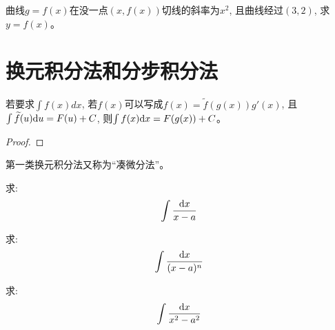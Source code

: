 \begin{example}
    曲线$g=f(x)$在没一点$(x, f(x))$切线的斜率为$x^2$, 且曲线经过$(3, 2)$, 求$y = f(x)$。
\end{example}
\begin{solution}
    
\end{solution}

\section{换元积分法和分步积分法}
\begin{theorem}[第一类换元积分法]
    若要求$\int f(x) dx$, 若$f(x)$可以写成$f(x)=\widetilde{f}(g(x))g'(x)$, 且$\int \widetilde{f}(u) \mathrm{d} u = F(u) + C$, 则$\int f(x) \mathrm{d} x = F(g(x)) + C$。    
\end{theorem}
\begin{proof}
    
\end{proof}
\begin{remark}
    第一类换元积分法又称为``凑微分法''。
\end{remark}

\begin{example}
    求:
    \begin{equation*}
        \int \frac{\mathrm{d} x}{x - a}
    \end{equation*}
\end{example}
\begin{solution}
    
\end{solution}

\begin{example}
    求:
    \begin{equation*}
        \int \frac{\mathrm{d} x}{(x-a)^n}
    \end{equation*}
\end{example}
\begin{solution}
    
\end{solution}

\begin{example}
    求:
    \begin{equation*}
        \int \frac{\mathrm{d} x}{x^2 - a^2}
    \end{equation*}
\end{example}
\begin{solution}
    
\end{solution}

